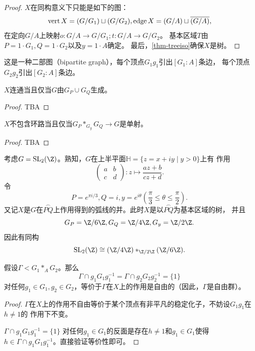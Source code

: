 \begin{proof}
    $X$在同构意义下只能是如下的图：
    \[\operatorname{vert} X = (G/G_1) \sqcup (G/G_2),\operatorname{edge} X = (G/A) \sqcup \overline{(G/A)},\]
    在定向$G/A$上映射$o\colon G/A \to G/G_1;t\colon G/A \to G/G_2$。
    基本区域$T$由$P = 1\cdot G_1,Q = 1\cdot G_2$以及$y = 1\cdot A$确定。
    最后，\ref{thm-treeiso}确保$X$是树。
\end{proof}
\begin{remark}
    这是一种二部图（bipartite graph），每个顶点$G_1g_1$引出$[G_1:A]$条边，
    每个顶点$G_2g_2$引出$[G_2:A]$条边。
\end{remark}
\begin{lemma}\label{lem-con}
    $X$连通当且仅当$G$由$G_P \cup G_Q$生成。
\end{lemma}
\begin{proof}
    TBA
\end{proof}
\begin{lemma}\label{lem-nocir}
    $X$不包含环路当且仅当$G_P *_{G_y} G_Q \to G$是单射。
\end{lemma}
\begin{proof}
    TBA
\end{proof}
\begin{example}
    考虑$G = \operatorname{SL}_2(\Z)$。熟知，$G$在上半平面$\mathbb{H} = \{z=x+iy \mid y>0\}$上有
    作用\[\begin{pmatrix}
        a & b\\c & d
    \end{pmatrix}\colon z \mapsto \frac{az+b}{cz+d}.\]令\[P = e^{\pi i/3},Q = i,y = e^{i\theta}\left(\frac{\pi}{3}\leqslant \theta \leqslant \frac{\pi}{2}\right).\]
    又记$X$是$G$在$\overset{\frown}{PQ}$上作用得到的弧线的并。此时$X$是以$\overset{\frown}{PQ}$为基本区域的树，
    并且\[G_P = \Z/6\Z,G_Q = \Z/4\Z, G_y = \Z/2\Z.\]因此有同构\[\operatorname{SL}_2(\Z) \cong (\Z/4\Z) *_{\Z/2\Z} (\Z/6\Z).\]
\end{example}
\begin{proposition}
    假设$\Gamma < G_1 *_A G_2$。那么\[\Gamma \cap g_1G_1g_1^{-1} = \Gamma \cap g_2G_2g_2^{-1} = \{1\}\]
    对任何$g_1 \in G_1,g_2 \in G_2$，等价于$\Gamma$在$X$上的作用是自由的（因此，$\Gamma$是自由群）。
\end{proposition}
\begin{proof}
    $\Gamma$在$X$上的作用不自由等价于某个顶点有非平凡的稳定化子，不妨设$G_1g_1$在$h \neq 1$的
    作用下不变。

    $\Gamma \cap g_1G_1g_1^{-1} = \{1\}$
    对任何$g_1 \in G_1$的反面是存在$h \neq 1$和$g_1 \in G_1$使得$h \in \Gamma \cap g_1G_1g_1^{-1}$。直接验证等价性即可。
\end{proof}
